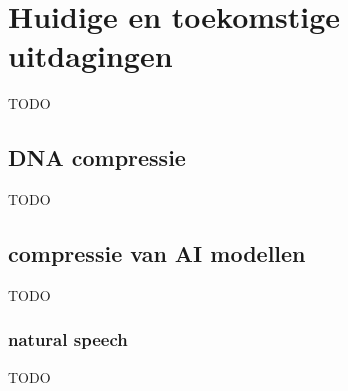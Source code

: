 \chapter{Huidige en toekomstige uitdagingen}
\label{ch:uitdagingen}

TODO

\section{DNA compressie}
\label{sec:uitdagingen-dna-compressie}

TODO

\section{compressie van AI modellen}
\label{sec:uitdagingen-ai}

TODO

\subsection{natural speech}
\label{sec:uitdagingen-ai-speech}

TODO
